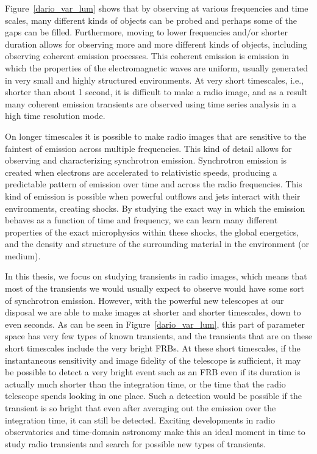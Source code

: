 \documentclass[12pt]{article}
\begin{document}
Figure~\ref{dario_var_lum} \citep{2015MNRAS.446.3687P} shows that by observing at various frequencies and time scales, many different kinds of objects can be probed and perhaps some of the gaps can be filled. Furthermore, moving to lower frequencies and/or shorter duration allows for observing more and more different kinds of objects, including observing coherent emission processes. This coherent emission is emission in which the properties of the electromagnetic waves are uniform, usually generated in very small and highly structured environments. At very short timescales, i.e., shorter than about 1 second, it is difficult to make a radio image, and as a result many coherent emission transients are observed using time series analysis in a high time resolution mode. 

On longer timescales it is possible to make radio images that are sensitive to the faintest of emission across multiple frequencies. This kind of detail allows for observing and characterizing synchrotron emission. Synchrotron emission is created when electrons are accelerated to relativistic speeds, producing a predictable pattern of emission over time and across the radio frequencies. This kind of emission is possible when powerful outflows and jets interact with their environments, creating shocks. By studying the exact way in which the emission behaves as a function of time and frequency, we can learn many different properties of the exact microphysics within these shocks, the global energetics, and the density and structure of the surrounding material in the environment (or medium).

 In this thesis, we focus on studying transients in radio images, which means that most of the transients we would usually expect to observe would have some sort of synchrotron emission. However, with the powerful new telescopes at our disposal we are able to make images at shorter and shorter timescales, down to even seconds. As can be seen in Figure~\ref{dario_var_lum}, this part of parameter space has very few types of known transients, and the transients that are on these short timescales include the very bright FRBs. At these short timescales, if the instantaneous sensitivity and image fidelity of the telescope is sufficient, it may be possible to detect a very bright event such as an FRB even if its duration is actually much shorter than the integration time, or the time that the radio telescope spends looking in one place. Such a detection would be possible if the transient is so bright that even after averaging out the emission over the integration time, it can still be detected. Exciting developments in radio observatories and time-domain astronomy make this an ideal moment in time to study radio transients and search for possible new types of transients.
\end{document}

